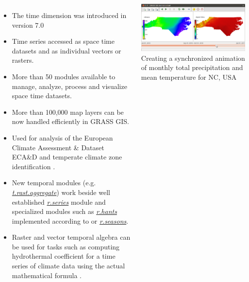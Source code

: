 \documentclass[25pt, margin=0mm, innermargin=25mm, blockverticalspace=25mm, colspace=25mm, subcolspace=8mm]{tikzposter}
\newcommand{\CustomBlockFontSize}{\LARGE}
\newcommand{\gmodule}[1]{\href{http://grass.osgeo.org/grass74/manuals/#1.html}{\emph{#1}}}
\newcommand{\gamodule}[1]{\href{http://grass.osgeo.org/grass74/manuals/addons/#1.html}{\emph{#1}}}
\begin{document}
\begin{columns}
{\CustomBlockFontSize

\begin{itemize}
 \item The time dimension was introduced in version 7.0 \citep{Gebbert20141, gebbert2015grass}
 \item Time series accessed as space time datasets and as individual vectors or rasters.
 \item More than 50 modules available to manage, analyze, process and visualize space time datasets.
 \item More than 100,000 map layers can be now handled efficiently in GRASS GIS.
 \item Used for analysis of the European Climate Assessment \& Dataset ECA\&D \citep{Haylock2008_climate_series}
       and temperate climate zone identification \citep{Gebbert20141}.
 \item New temporal modules (e.g. \gmodule{t.rast.aggregate}) work beside well established \gmodule{r.series} module
       and specialized modules such as \gamodule{r.hants} implemented according to \cite{roerink2000reconstructing} or \gamodule{r.seasons}.
 \item Raster and vector temporal algebra can be used for tasks
       such as computing hydrothermal coefficient for a time series of climate data using the actual mathematical formula
       \citep{leppelt2015grass}.
\end{itemize}

\vspace*{.5ex}

\begin{minipage}{\linewidth}
\centering
\includegraphics[width=\linewidth]{images/temporal_precip_temp}
\\
Creating a synchronized animation of monthly total precipitation and mean temperature for NC, USA
\end{minipage}


}
\end{columns}
\end{document}

